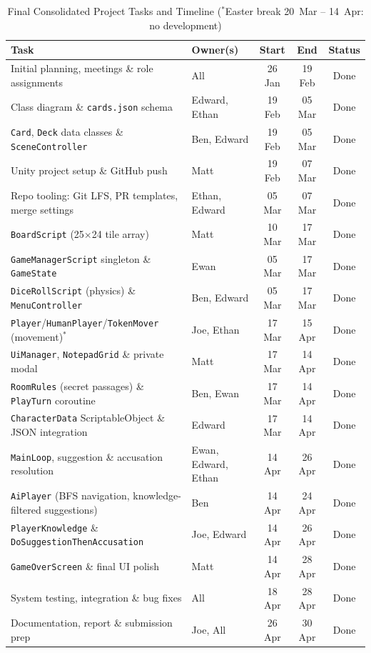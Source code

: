 \begin{table}[H]
    \centering
    \footnotesize
    \setlength{\tabcolsep}{4pt}
    \begin{tabular}{|p{5.5cm}|p{1.8cm}|c|c|c|}
        \hline
        \textbf{Task} & \textbf{Owner(s)} & \textbf{Start} & \textbf{End} & \textbf{Status} \\ \hline
        Initial planning, meetings \& role assignments & All & 26 Jan & 19 Feb & Done \\ \hline
        Class diagram \& \texttt{cards.json} schema & Edward, Ethan & 19 Feb & 05 Mar & Done \\ \hline
        \texttt{Card}, \texttt{Deck} data classes \& \texttt{SceneController} & Ben, Edward & 19 Feb & 05 Mar & Done \\ \hline
        Unity project setup \& GitHub push & Matt & 19 Feb & 07 Mar & Done \\ \hline
        Repo tooling: Git LFS, PR templates, merge settings & Ethan, Edward & 05 Mar & 07 Mar & Done \\ \hline
        \texttt{BoardScript} (25$\times$24 tile array) & Matt & 10 Mar & 17 Mar & Done \\ \hline
        \texttt{GameManagerScript} singleton \& \texttt{GameState} & Ewan & 05 Mar & 17 Mar & Done \\ \hline
        \texttt{DiceRollScript} (physics) \& \texttt{MenuController} & Ben, Edward & 05 Mar & 17 Mar & Done \\ \hline
        \texttt{Player}/\texttt{HumanPlayer}/\texttt{TokenMover} (movement)$^*$ & Joe, Ethan & 17 Mar & 15 Apr & Done \\ \hline
        \texttt{UiManager}, \texttt{NotepadGrid} \& private modal & Matt & 17 Mar & 14 Apr & Done \\ \hline
        \texttt{RoomRules} (secret passages) \& \texttt{PlayTurn} coroutine & Ben, Ewan & 17 Mar & 14 Apr & Done \\ \hline
        \texttt{CharacterData} ScriptableObject \& JSON integration & Edward & 17 Mar & 14 Apr & Done \\ \hline
        \texttt{MainLoop}, suggestion \& accusation resolution & Ewan, Edward, Ethan & 14 Apr & 26 Apr & Done \\ \hline
        \texttt{AiPlayer} (BFS navigation, knowledge-filtered suggestions) & Ben & 14 Apr & 24 Apr & Done \\ \hline
        \texttt{PlayerKnowledge} \& \texttt{DoSuggestionThenAccusation} & Joe, Edward & 14 Apr & 26 Apr & Done \\ \hline
        \texttt{GameOverScreen} \& final UI polish & Matt & 14 Apr & 28 Apr & Done \\ \hline
        System testing, integration \& bug fixes & All & 18 Apr & 28 Apr & Done \\ \hline
        Documentation, report \& submission prep & Joe, All & 26 Apr & 30 Apr & Done \\ \hline
    \end{tabular}
    \caption{Final Consolidated Project Tasks and Timeline ($^*$Easter break 20~Mar -- 14~Apr: no development)}
    \label{tab:gantt_tasks}
\end{table}

